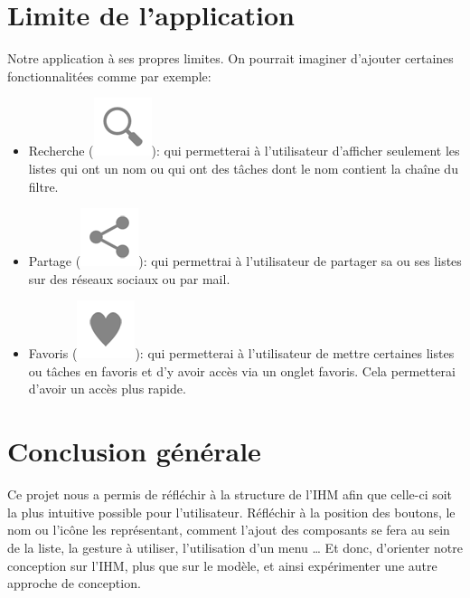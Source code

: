 \documentclass[a4paper,10pt]{article}
\begin{document}
\newpage
\section{Limite de l'application}
Notre application à ses propres limites.
On pourrait imaginer d'ajouter certaines fonctionnalitées comme par exemple:
\begin{itemize}
\item Recherche (\includegraphics[scale=0.2]{Images/search.png}): qui permetterai à l'utilisateur d'afficher seulement les listes qui ont un nom ou qui ont des tâches dont le nom contient la chaîne du filtre.
\item Partage (\includegraphics[scale=0.2]{Images/share.png}): qui permettrai à l'utilisateur de partager sa ou ses listes sur des réseaux sociaux ou par mail.
\item Favoris (\includegraphics[scale=0.2]{Images/favorite.png}): qui permetterai à l'utilisateur de mettre certaines listes ou tâches en favoris et d'y avoir accès via un onglet favoris. Cela permetterai d'avoir un accès plus rapide.
\end{itemize}

\newpage
\section{Conclusion générale}
Ce projet nous a permis de réfléchir à la structure de l'IHM afin que celle-ci soit la plus intuitive possible pour l'utilisateur. Réfléchir à la position des
boutons, le nom ou l'icône les représentant, comment l'ajout des composants se fera au sein de la liste, la gesture à utiliser, l'utilisation d'un menu \ldots{}
Et donc, d'orienter notre conception sur l'IHM, plus que sur le modèle, et ainsi expérimenter une autre approche de conception.
\end{document}
